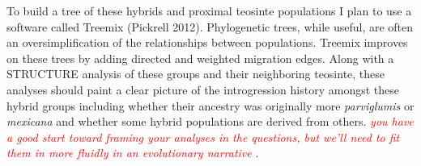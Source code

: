 \documentclass[12pt]{amsart}
\newcommand{\mbh}[1]{\textcolor{red}{ \emph{\scriptsize  #1}} }
\begin{document}
To build a tree of these hybrids and proximal teosinte populations I plan to use a software called Treemix (Pickrell 2012).
Phylogenetic trees, while useful, are often an oversimplification of the relationships between populations. %
Treemix improves on these trees by adding directed and weighted migration edges. %
Along with a STRUCTURE analysis of these groups and their neighboring teosinte, these analyses should paint a clear picture of the introgression history amongst these hybrid groups including whether their ancestry was originally more \textit{parviglumis} or \textit{mexicana} and whether some hybrid populations are derived from others.
\mbh{you have a good start toward framing your analyses in the questions, but we'll need to fit them in more fluidly in an evolutionary narrative}.
\end{document}
